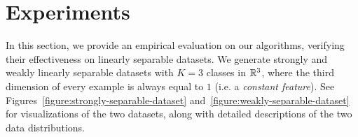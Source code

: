 \section{Experiments}
\label{section:experiments}

In this section, we provide an empirical evaluation on our algorithms, verifying their
effectiveness on linearly separable datasets.
We generate strongly and weakly linearly separable datasets with $K=3$ classes in
$\mathbb{R}^3$, where the third dimension of every example is always equal to $1$
(i.e. a \emph{constant feature}).
See Figures~\ref{figure:strongly-separable-dataset} and~\ref{figure:weakly-separable-dataset}
 for visualizations
of the two datasets, along with detailed descriptions of the two data distributions.


